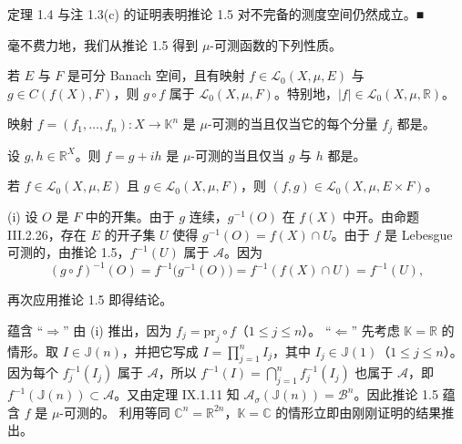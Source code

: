 \begin{remark}

定理 1.4 与注 1.3(c) 的证明表明推论 1.5 对不完备的测度空间仍然成立。\nobreak\hspace{0.35em}■

毫不费力地，我们从推论 1.5 得到 $ \mu $-可测函数的下列性质。

\end{remark}

\begin{theorem}

\begin{subitems}
\item

若 $ E $ 与 $ F $ 是可分 Banach 空间，且有映射 $ f \in \mathcal{L}_0(X,\mu,E) $ 与 $ g \in C(f(X),F) $，则 $ g \circ f $ 属于 $ \mathcal{L}_0(X,\mu,F) $。特别地，$ |f| \in \mathcal{L}_0(X,\mu,\mathbb{R}) $。

\item

映射 $ f = (f_1,\ldots,f_n): X \to \mathbb{K}^n $ 是 $ \mu $-可测的当且仅当它的每个分量 $ f_j $ 都是。

\item

设 $ g, h \in \mathbb{R}^X $。则 $ f = g + ih $ 是 $ \mu $-可测的当且仅当 $ g $ 与 $ h $ 都是。

\item

若 $ f \in \mathcal{L}_0(X,\mu,E) $ 且 $ g \in \mathcal{L}_0(X,\mu,F) $，则 $ (f,g) \in \mathcal{L}_0(X,\mu,E \times F) $。

\proofhead
(i) 设 $ O $ 是 $ F $ 中的开集。由于 $ g $ 连续，$ g^{-1}(O) $ 在 $ f(X) $ 中开。由命题 III.2.26，存在 $ E $ 的开子集 $ U $ 使得 $ g^{-1}(O) = f(X) \cap U $。由于 $ f $ 是 Lebesgue 可测的，由推论 1.5，$ f^{-1}(U) $ 属于 $ \mathcal{A} $。因为
\[
(g \circ f)^{-1}(O) = f^{-1}\bigl(g^{-1}(O)\bigr) = f^{-1}(f(X) \cap U) = f^{-1}(U) ,
\]

再次应用推论 1.5 即得结论。

\end{subitems}

\begin{subitems}
\item[（ii）]

蕴含 “$ \Rightarrow $” 由 (i) 推出，因为 $ f_j = \mathrm{pr}_j \circ f $（$ 1 \le j \le n $）。
“$ \Leftarrow $” 先考虑 $ \mathbb{K} = \mathbb{R} $ 的情形。取 $ I \in \mathbb{J}(n) $，并把它写成 $ I = \prod_{j=1}^{n} I_j $，其中 $ I_j \in \mathbb{J}(1) $（$ 1 \le j \le n $）。因为每个 $ f_j^{-1}(I_j) $ 属于 $ \mathcal{A} $，所以 $ f^{-1}(I) = \bigcap_{j=1}^{n} f_j^{-1}(I_j) $ 也属于 $ \mathcal{A} $，即 $ f^{-1}(\mathbb{J}(n)) \subset \mathcal{A} $。又由定理 IX.1.11 知 $ \mathcal{A}_\sigma(\mathbb{J}(n)) = \mathcal{B}^n $。因此推论 1.5 蕴含 $ f $ 是 $ \mu $-可测的。
利用等同 $ \mathbb{C}^n = \mathbb{R}^{2n} $，$ \mathbb{K} = \mathbb{C} $ 的情形立即由刚刚证明的结果推出。


\end{subitems}
\end{theorem}

